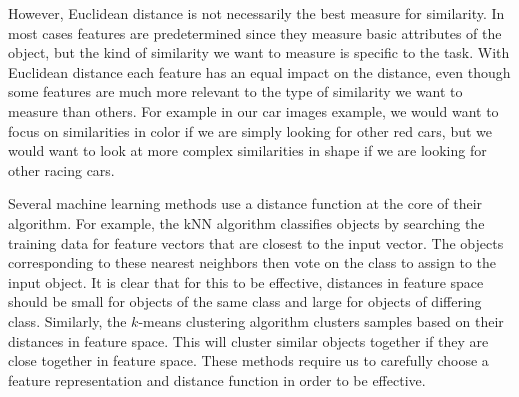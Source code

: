 However, Euclidean distance is not necessarily the best measure for similarity. In most cases features are predetermined since they measure basic attributes of the object, but the kind of similarity we want to measure is specific to the task. With Euclidean distance each feature has an equal impact on the distance, even though some features are much more relevant to the type of similarity we want to measure than others. For example in our car images example, we would want to focus on similarities in color if we are simply looking for other red cars, but we would want to look at more complex similarities in shape if we are looking for other racing cars. 

Several machine learning methods use a distance function at the core of their algorithm. For example, the \ac{kNN} algorithm classifies objects by searching the training data for feature vectors that are closest to the input vector. The objects corresponding to these nearest neighbors then vote on the class to assign to the input object. It is clear that for this to be effective, distances in feature space should be small for objects of the same class and large for objects of differing class. Similarly, the $k$-means clustering algorithm clusters samples based on their distances in feature space. This will cluster similar objects together if they are close together in feature space. These methods require us to carefully choose a feature representation and distance function in order to be effective.

